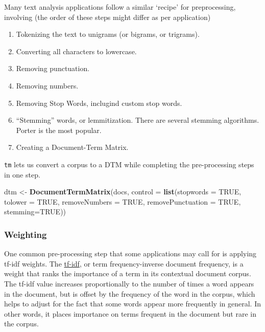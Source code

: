 \documentclass[]{book}
\newenvironment{Shaded}{\begin{snugshade}}{\end{snugshade}}
\newcommand{\KeywordTok}[1]{\textcolor[rgb]{0.13,0.29,0.53}{\textbf{#1}}}
\newcommand{\DataTypeTok}[1]{\textcolor[rgb]{0.13,0.29,0.53}{#1}}
\newcommand{\StringTok}[1]{\textcolor[rgb]{0.31,0.60,0.02}{#1}}
\newcommand{\OtherTok}[1]{\textcolor[rgb]{0.56,0.35,0.01}{#1}}
\newcommand{\NormalTok}[1]{#1}
\providecommand{\tightlist}{%
  \setlength{\itemsep}{0pt}\setlength{\parskip}{0pt}}
\begin{document}
Many text analysis applications follow a similar `recipe' for
preprocessing, involving (the order of these steps might differ as per
application)

\begin{enumerate}
\def\labelenumi{\arabic{enumi}.}
\tightlist
\item
  Tokenizing the text to unigrams (or bigrams, or trigrams).
\item
  Converting all characters to lowercase.
\item
  Removing punctuation.
\item
  Removing numbers.
\item
  Removing Stop Words, inclugind custom stop words.
\item
  ``Stemming'' words, or lemmitization. There are several stemming
  algorithms. Porter is the most popular.
\item
  Creating a Document-Term Matrix.
\end{enumerate}

\texttt{tm} lets us convert a corpus to a DTM while completing the
pre-processing steps in one step.

\begin{Shaded}
\begin{Highlighting}[]
\NormalTok{dtm <-}\StringTok{ }\KeywordTok{DocumentTermMatrix}\NormalTok{(docs,}
           \DataTypeTok{control =} \KeywordTok{list}\NormalTok{(}\DataTypeTok{stopwords =} \OtherTok{TRUE}\NormalTok{,}
                          \DataTypeTok{tolower =} \OtherTok{TRUE}\NormalTok{,}
                          \DataTypeTok{removeNumbers =} \OtherTok{TRUE}\NormalTok{,}
                          \DataTypeTok{removePunctuation =} \OtherTok{TRUE}\NormalTok{,}
                          \DataTypeTok{stemming=}\OtherTok{TRUE}\NormalTok{))}
\end{Highlighting}
\end{Shaded}

\subsubsection*{Weighting}\label{weighting}

One common pre-processing step that some applications may call for is
applying tf-idf weights. The
\href{https://en.wikipedia.org/wiki/Tf\%E2\%80\%93idf}{tf-idf}, or term
frequency-inverse document frequency, is a weight that ranks the
importance of a term in its contextual document corpus. The tf-idf value
increases proportionally to the number of times a word appears in the
document, but is offset by the frequency of the word in the corpus,
which helps to adjust for the fact that some words appear more
frequently in general. In other words, it places importance on terms
frequent in the document but rare in the corpus.
\end{document}
